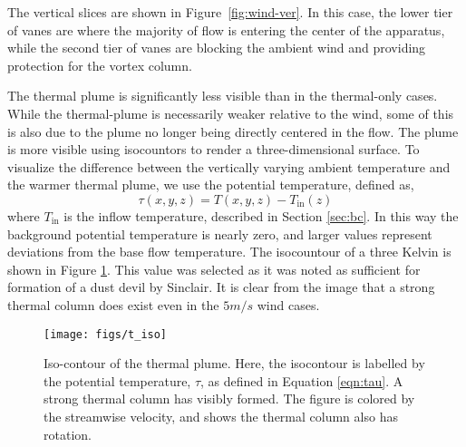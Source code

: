 
The vertical slices are shown in Figure~\ref{fig:wind-ver}. In this
case, the lower tier of vanes are where the majority of flow is 
entering the center of the apparatus, while the second tier of vanes are
blocking the ambient wind and providing protection for the vortex column. 

The thermal plume is significantly less
visible than in the thermal-only cases. While the
thermal-plume is necessarily weaker relative to the wind, some of this
is also due to the plume no longer being directly centered in the
flow. The plume is more visible using isocountors to render a
three-dimensional surface. 
To visualize the difference between the vertically varying ambient
temperature and the warmer thermal plume, we use the potential
temperature, defined as, 
\begin{equation}
  \tau(x,y,z) = T(x,y,z) -T_{\text{in}}(z) 
   \label{eqn:tau}
\end{equation}
where $T_{\text{in}}$ is the inflow temperature, described
in Section \ref{sec:bc}. In this way the background potential
temperature is nearly zero, and larger values represent deviations from
the base flow temperature. The isocountour of a three Kelvin is 
shown in Figure \ref{fig:field_real}. This value was selected as
it was noted as sufficient for formation of a dust devil by
Sinclair\cite{Sinclair1969}. It is clear from the image that a 
strong thermal column does exist even in the $5 m/s$ wind cases. 

%
%
  \begin{figure}[!htb]
   \begin{center}
    \texttt{[image: figs/t\_iso]}
    \caption{Iso-contour of the thermal plume. Here, the isocontour is
    labelled by the potential temperature, $\tau$, as defined in
    Equation \ref{eqn:tau}. A strong thermal column has visibly formed. The
    figure is colored by the streamwise velocity, and shows the thermal
    column also has rotation.} 
    \label{fig:field_real}
   \end{center}
  \end{figure}


